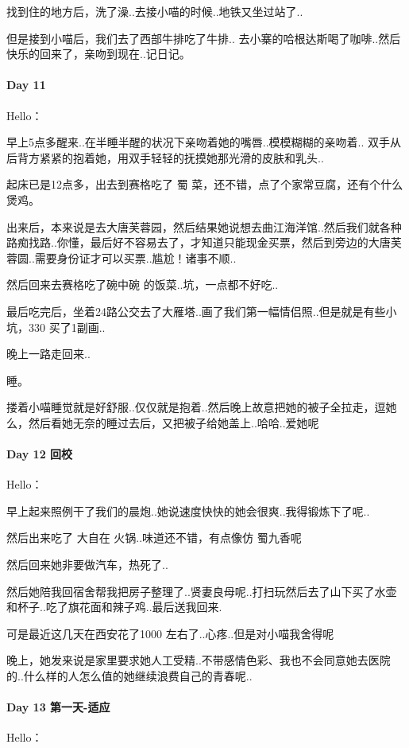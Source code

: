 \documentclass[UTF8,a4paper,8pt]{ctexart}
\begin{document}
	 	找到住的地方后，洗了澡..去接小喵的时候..地铁又坐过站了..
	 	
	 	但是接到小喵后，我们去了西部牛排吃了牛排.. 去小寨的哈根达斯喝了咖啡..然后快乐的回来了，亲吻到现在..记日记。
 	 \paragraph{Day 11      \quad     }
	 	 Hello：
	 	 
	 	 早上5点多醒来..在半睡半醒的状况下亲吻着她的嘴唇..模模糊糊的亲吻着.. 双手从后背方紧紧的抱着她，用双手轻轻的抚摸她那光滑的皮肤和乳头..
	 	 
	 	 起床已是12点多，出去到赛格吃了 蜀 菜，还不错，点了个家常豆腐，还有个什么煲鸡。
	 	 
	 	 出来后，本来说是去大唐芙蓉园，然后结果她说想去曲江海洋馆..然后我们就各种路痴找路..你懂，最后好不容易去了，才知道只能现金买票，然后到旁边的大唐芙蓉圆..需要身份证才可以买票..尴尬！诸事不顺..
	 	 
	 	 然后回来去赛格吃了碗中碗 的饭菜..坑，一点都不好吃..
	 	 
	 	 最后吃完后，坐着24路公交去了大雁塔..画了我们第一幅情侣照..但是就是有些小坑，330 买了1副画..
	 	 
	 	 晚上一路走回来..
	 	 
	 	 睡。
	 	 
	 	 搂着小喵睡觉就是好舒服..仅仅就是抱着..然后晚上故意把她的被子全拉走，逗她么，然后看她无奈的睡过去后，又把被子给她盖上..哈哈..爱她呢
 	 \paragraph{Day 12  回校   \quad     }
	 	 Hello：
	 	 
	 	 早上起来照例干了我们的晨炮..她说速度快快的她会很爽..我得锻炼下了呢..
	 	 
	 	 然后出来吃了 大自在 火锅..味道还不错，有点像仿 蜀九香呢
	 	 
	 	 然后回来她非要做汽车，热死了..
	 	 
	 	 然后她陪我回宿舍帮我把房子整理了..贤妻良母呢..打扫玩然后去了山下买了水壶和杯子..吃了旗花面和辣子鸡..最后送我回来.
	 	 
	 	 可是最近这几天在西安花了1000 左右了..心疼..但是对小喵我舍得呢
	 	 
	 	 晚上，她发来说是家里要求她人工受精..不带感情色彩、我也不会同意她去医院的..什么样的人怎么值的她继续浪费自己的青春呢..
	 	 
 	 \paragraph{Day 13  第一天-适应   \quad     }
	 	 Hello：
	 	 
\end{document}
